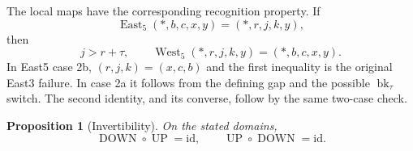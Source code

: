 \documentclass[11pt]{article}
\newtheorem{proposition}[theorem]{Proposition}
\theoremstyle{definition}
\theoremstyle{remark}
\newcommand{\UP}{\operatorname{UP}}
\newcommand{\DOWN}{\operatorname{DOWN}}
\newcommand{\East}{\operatorname{East}}
\newcommand{\West}{\operatorname{West}}
\newcommand{\bk}{\operatorname{bk}}
\begin{document}
The local maps have the corresponding recognition property.  If
\begin{equation}
  \East_5(*,b,c,x,y)=(*,r,j,k,y),
  \label{eq:east5-symbolic}
\end{equation}
then
\begin{equation}
  j>r+\tau,
  \qquad
  \West_5(*,r,j,k,y)=(*,b,c,x,y).
  \label{eq:east-west-inverse}
\end{equation}
In East5 case 2b, $(r,j,k)=(x,c,b)$ and the first inequality is the original
East3 failure.  In case 2a it follows from the defining gap and the possible
$\bk_\tau$ switch.  The second identity, and its converse, follow by the same
two-case check.

\begin{proposition}[Invertibility]
\label{prop:inverse}
On the stated domains,
\[
  \DOWN\circ\UP=\mathrm{id},
  \qquad
  \UP\circ\DOWN=\mathrm{id}.
\]
\end{proposition}
\end{document}
